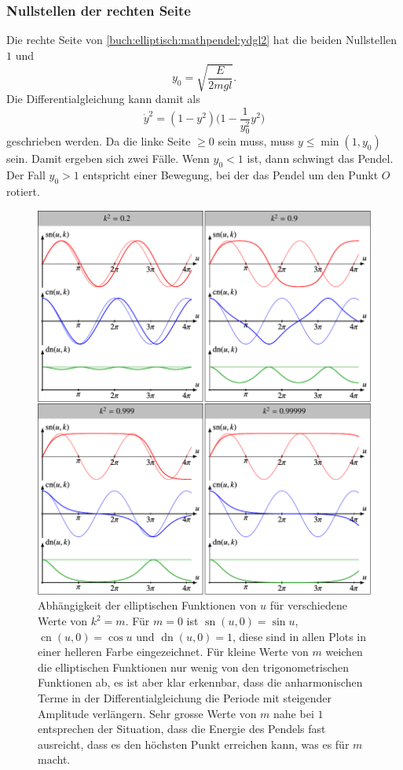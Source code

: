 \subsubsection{Nullstellen der rechten Seite}
Die rechte Seite von \eqref{buch:elliptisch:mathpendel:ydgl2}
hat die beiden Nullstellen $1$ und
\begin{equation}
y_0=\sqrt{\frac{E}{2mgl}}. 
\label{buch:elliptisch:mathpendel:y0}
\end{equation}
Die Differentialgleichung kann damit als
\begin{equation}
\dot{y}^2
=
(1-y^2)\biggl(1-\frac{1}{y_0^2}y^2\biggr)
\label{buch:elliptisch:mathpendel:y0dgl}
\end{equation}
geschrieben werden.
Da die linke Seite $\ge 0$ sein muss, muss 
\(
y\le \min(1,y_0)
\)
sein.
Damit ergeben sich zwei Fälle.
Wenn $y_0<1$ ist, dann schwingt das Pendel.
Der Fall $y_0>1$ entspricht einer Bewegung, bei der das Pendel
um den Punkt $O$ rotiert.


\begin{figure}
\centering
\includegraphics[width=\textwidth]{chapters/110-elliptisch/images/jacobiplots.pdf}
\caption{%
Abhängigkeit der elliptischen Funktionen von $u$ für
verschiedene Werte von $k^2=m$.
Für $m=0$ ist $\operatorname{sn}(u,0)=\sin u$, 
$\operatorname{cn}(u,0)=\cos u$ und $\operatorname{dn}(u,0)=1$, diese
sind in allen Plots in einer helleren Farbe eingezeichnet.
Für kleine Werte von $m$ weichen die elliptischen Funktionen nur wenig
von den trigonometrischen Funktionen ab,
es ist aber klar erkennbar, dass die anharmonischen Terme in der
Differentialgleichung die Periode mit steigender Amplitude verlängern.
Sehr grosse Werte von $m$ nahe bei $1$ entsprechen der Situation, dass
die Energie des Pendels fast ausreicht, dass es den höchsten Punkt
erreichen kann, was es für $m$ macht.
\label{buch:elliptisch:fig:jacobiplots}}
\end{figure}

